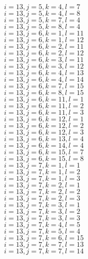 \documentclass[14pt]{article}
\begin{document}
    $i=13,j=5,k=4,l=7 $ \\ 
    $i=13,j=5,k=4,l=8 $ \\ 
    $i=13,j=5,k=7,l=4 $ \\ 
    $i=13,j=5,k=8,l=4 $ \\ 
    $i=13,j=6,k=1,l=11 $ \\ 
    $i=13,j=6,k=1,l=12 $ \\ 
    $i=13,j=6,k=2,l=11 $ \\ 
    $i=13,j=6,k=2,l=12 $ \\ 
    $i=13,j=6,k=3,l=11 $ \\ 
    $i=13,j=6,k=3,l=12 $ \\ 
    $i=13,j=6,k=4,l=13 $ \\ 
    $i=13,j=6,k=4,l=14 $ \\ 
    $i=13,j=6,k=7,l=15 $ \\ 
    $i=13,j=6,k=8,l=15 $ \\ 
    $i=13,j=6,k=11,l=1 $ \\ 
    $i=13,j=6,k=11,l=2 $ \\ 
    $i=13,j=6,k=11,l=3 $ \\ 
    $i=13,j=6,k=12,l=1 $ \\ 
    $i=13,j=6,k=12,l=2 $ \\ 
    $i=13,j=6,k=12,l=3 $ \\ 
    $i=13,j=6,k=13,l=4 $ \\ 
    $i=13,j=6,k=14,l=4 $ \\ 
    $i=13,j=6,k=15,l=7 $ \\ 
    $i=13,j=6,k=15,l=8 $ \\ 
    $i=13,j=7,k=1,l=1 $ \\ 
    $i=13,j=7,k=1,l=2 $ \\ 
    $i=13,j=7,k=1,l=3 $ \\ 
    $i=13,j=7,k=2,l=1 $ \\ 
    $i=13,j=7,k=2,l=2 $ \\ 
    $i=13,j=7,k=2,l=3 $ \\ 
    $i=13,j=7,k=3,l=1 $ \\ 
    $i=13,j=7,k=3,l=2 $ \\ 
    $i=13,j=7,k=3,l=3 $ \\ 
    $i=13,j=7,k=4,l=5 $ \\ 
    $i=13,j=7,k=5,l=4 $ \\ 
    $i=13,j=7,k=6,l=15 $ \\ 
    $i=13,j=7,k=7,l=13 $ \\ 
    $i=13,j=7,k=7,l=14 $ \\ 
\end{document}
